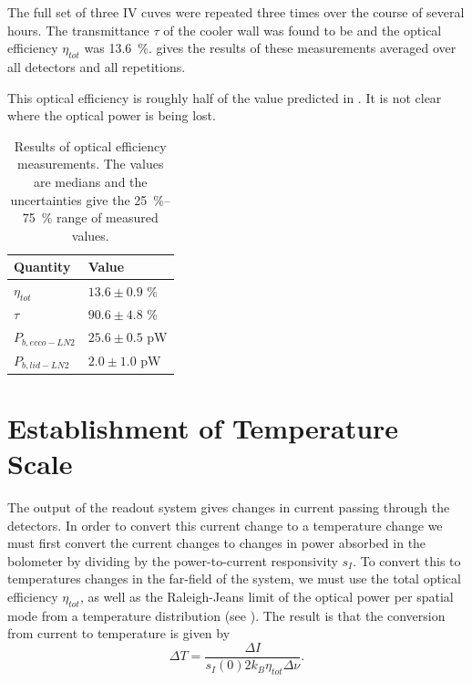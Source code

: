 The full set of three IV cuves were repeated three times over the course of several hours.
The transmittance $\tau$ of the cooler wall was found to be  and the optical efficiency $\eta_{tot}$ was \SI{13.6}{\percent}. 
 gives the results of these measurements averaged over all detectors and all repetitions.

This optical efficiency is roughly half of the value predicted in .
It is not clear where the optical power is being lost.

\begin{table}[t]
\centering
\caption{
Results of optical efficiency measurements.
The values are medians and the uncertainties give the \SIrange{25}{75}{\percent} range of measured values.
}
\label{tab:opt-eff}
\begin{tabular}{l l}
\toprule
Quantity &  Value \\
\midrule
$\eta_{tot}$ & $13.6 \pm  0.9$ \% \\ 
$\tau$ & $90.6 \pm  4.8$ \% \\ 
$P_{b,ecco-LN2}$   & $25.6 \pm  0.5$ pW \\ 
$P_{b,lid-LN2}$ & $ 2.0 \pm  1.0$ pW \\
\bottomrule
\end{tabular}
\end{table}
 
\section{Establishment of Temperature Scale} \label{sec:ch8-temp-scale}

The output of the readout system gives changes in current passing through the detectors.
In order to convert this current change to a temperature change we must first convert the current changes to changes in power absorbed in the bolometer by dividing by the power-to-current responsivity $s_I$.
To convert this to temperatures changes in the far-field of the system, we must use the total optical efficiency $\eta_{tot}$, as well as the Raleigh-Jeans limit of the optical power per spatial mode from a temperature distribution (see ).
The result is that the conversion from current to temperature is given by
\begin{equation} \label{eqn:ch8-I-to-T}
  \Delta T = \frac{\Delta I}{s_I(0) 2 k_B \eta_{tot} \Delta \nu}.
\end{equation}

